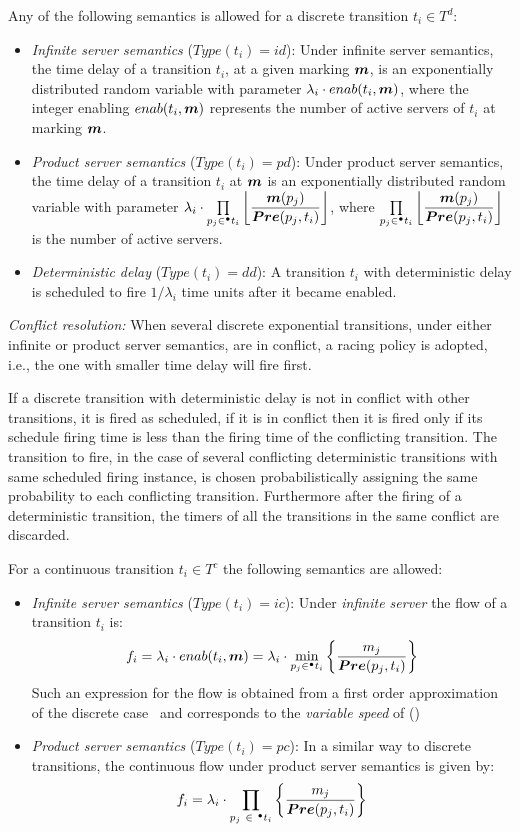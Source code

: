 Any of the following semantics is allowed for a discrete transition $t_i\in T^d$:
\begin{itemize}
\item \emph{Infinite server semantics} ($Type(t_i)=id$): Under infinite server
semantics, the time delay of a transition $t_i$, at a given marking $\b{m}$, is an exponentially distributed
random variable with parameter $\lambda_i\cdot enab(t_i,\b{m})$,
where the integer enabling $enab(t_i,\b{m})$ represents the number of active servers of
$t_i$ at marking $\b{m}$.
\item \emph{Product server semantics} ($Type(t_i)=pd$): Under product server
semantics, the time delay of a transition $t_i$ at $\b{m}$ is an exponentially
distributed random variable with parameter $\lambda_i \cdot
\prod\limits_{p_j\in \preset{t_i}} \left\lfloor\dfrac{\b{m}(p_j)}{\b{Pre}(p_j,t_i)}\right\rfloor$, where
$\prod\limits_{p_j\in \preset{t_i}} \left\lfloor\dfrac{\b{m}(p_j)}{\b{Pre}(p_j,t_i)}\right\rfloor$ is the number of active servers.
\item \emph{Deterministic delay} ($Type(t_i)=dd$): A transition $t_i$ with deterministic
delay is scheduled to fire $1/\lambda_i$ time units after it became enabled.
\end{itemize}

\emph{Conflict resolution:} When several discrete exponential transitions, under either infinite or product server semantics, are in conflict, a racing policy is adopted, i.e., the one with smaller time delay will fire first.

If a discrete transition with deterministic delay is not in conflict with other transitions, it is fired as scheduled, if it is in conflict then
it is fired only if its schedule firing time is less than the firing time of the conflicting
transition. The transition to fire, in the case of several conflicting deterministic transitions
with same scheduled firing instance, is chosen probabilistically assigning the same probability
to each conflicting transition. Furthermore after the firing of a
deterministic transition, the timers of all the transitions in the same conflict are discarded.

For a continuous transition $t_i\in T^c$ the following semantics are allowed:
\begin{itemize}
\item \emph{Infinite server semantics} ($Type(t_i)=ic$): Under \emph{infinite server}
the flow of a transition $t_i$ is:
\begin{equation}\label{eq-flowinf}
f_i=\lambda_i \cdot enab(t_i,\b{m}) = \lambda_i \cdot \min
\limits_{p_j \in \preset{t_i}} \left\{ \frac{m_j}{\b{Pre}(p_j,t_i)}
\right\}
\end{equation}
Such an expression for the flow is obtained from a first order approximation of the
discrete case~\cite{ARSiRe02} and corresponds to the \emph{variable speed} of
(\cite{ARAlDa98})
\item \emph{Product server  semantics} ($Type(t_i)=pc$): In a similar way to discrete
transitions, the continuous flow under product server semantics is given by:
$$f_i=\lambda_i\cdot\prod_{p_j\ \in\ \preset{t_i}}{\biggl\{\frac{m_j}{\b{Pre}(p_j,t_i)}\biggr\}}$$
\end{itemize}


